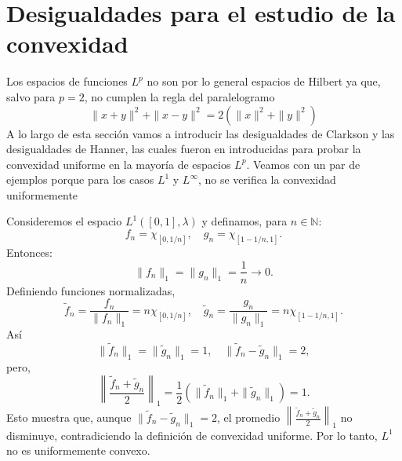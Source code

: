 \section{Desigualdades para el estudio de la convexidad}
Los espacios de funciones $ L^p $ no son por lo general espacios de Hilbert ya que, salvo para $ p = 2 $, no cumplen la regla del paralelogramo
\begin{equation}
    \| x + y \|^2 + \| x - y \|^2 = 2 \left( \| x \|^2 + \| y\|^2 \right)
\end{equation}
A lo largo de esta sección vamos a introducir las desigualdades de Clarkson y las desigualdades de Hanner, las cuales fueron en introducidas para probar la convexidad uniforme en la mayoría de espacios $ L^p $. Veamos con un par de ejemplos porque para los casos $ L^1 $ y $ L^\infty $, no se verifica la convexidad uniformemente

\begin{example}
    Consideremos el espacio \(L^1([0,1], \lambda)\) y definamos, para \(n \in \mathbb{N}\):
    \begin{equation}
        f_n = \chi_{[0,1/n]}, \quad g_n = \chi_{[1-1/n,1]}.
    \end{equation}
    Entonces:
    \begin{equation}
        \|f_n\|_1 = \|g_n\|_1 = \frac{1}{n} \to 0.
    \end{equation}
    Definiendo funciones normalizadas,
    \begin{equation}
        \tilde{f}_n = \frac{f_n}{\|f_n\|_1} = n \chi_{[0,1/n]}, \quad \tilde{g}_n = \frac{g_n}{\|g_n\|_1} = n \chi_{[1-1/n,1]}.
    \end{equation}
    Así
    \begin{equation}
        \|\tilde{f}_n\|_1 = \|\tilde{g}_n\|_1 = 1, \quad \|\tilde{f}_n - \tilde{g}_n\|_1 = 2,
    \end{equation}
    pero,
    \begin{equation}
        \left\|\frac{\tilde{f}_n + \tilde{g}_n}{2}\right\|_1 = \frac{1}{2}(\|\tilde{f}_n\|_1 + \|\tilde{g}_n\|_1) = 1.
    \end{equation}
    Esto muestra que, aunque \(\|\tilde{f}_n - \tilde{g}_n\|_1 = 2\), el promedio \(\left\|\frac{\tilde{f}_n + \tilde{g}_n}{2}\right\|_1\) no disminuye, contradiciendo la definición de convexidad uniforme.  
    Por lo tanto, \(L^1\) no es uniformemente convexo.  
\end{example}

